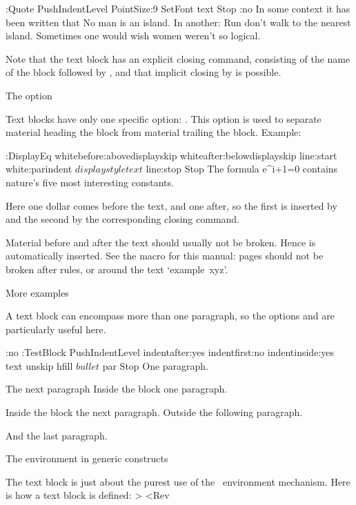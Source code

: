 \Example
\DefineTextBlock:Quote 
 PushIndentLevel PointSize:9 SetFont text Stop
\Indent:no In some context it has been written that
\Quote No man is an island.\QuoteStop
In another:
\Quote Run don't walk to the nearest island.\>
Sometimes one would wish women weren't so logical.
\ExampleStop

Note that the text block has an explicit closing command,
consisting of the name of the block followed by ,
and that implicit closing by \cs{>} is possible.
 
\Section The  option

Text blocks have only one specific option: . This option
is used to separate material heading the block from material trailing
the block. Example:

\Example
\DefineTextBlock:DisplayEq 
 whitebefore:abovedisplayskip whiteafter:belowdisplayskip
 line:start white:parindent $ displaystyle text $ line:stop Stop
The formula
\DisplayEq e^{\pi i}+1=0\>
contains nature's five most interesting constants.
\ExampleStop

Here one dollar comes before the text, and one after, so the first is
inserted by  and the second by the corresponding
closing command.

Material before and after the text should usually not be broken.
Hence  is automatically inserted. See the 
macro for this manual: pages should not be broken after rules, or
around the text `example~xyz'.

\Section More examples

A text block can encompass more than one paragraph, so the options
 and  are particularly useful here.

\Example
\AlwaysIndent:no
\DefineTextBlock:TestBlock PushIndentLevel
 indentafter:yes indentfirst:no indentinside:yes 
 text unskip hfill $ bullet $ par Stop
One paragraph.\par The next paragraph
\TestBlock Inside the block one paragraph.\par
Inside the block the next paragraph.\>
Outside the following paragraph.\par And the last paragraph.
\ExampleStop
 
\ImpNote 
{} The environment in generic constructs

The text block is just about the purest use of the \Lollipop\
environment mechanism. Here is how a text block is defined:
\Ver>
\def\@DefineTextBlock{
    \csarg\edef{\@name}{\@gen@open
        \the\before@coms
        }
    \@DefineStopCommand{\the\after@coms \@gen@close}
    }<Rev

